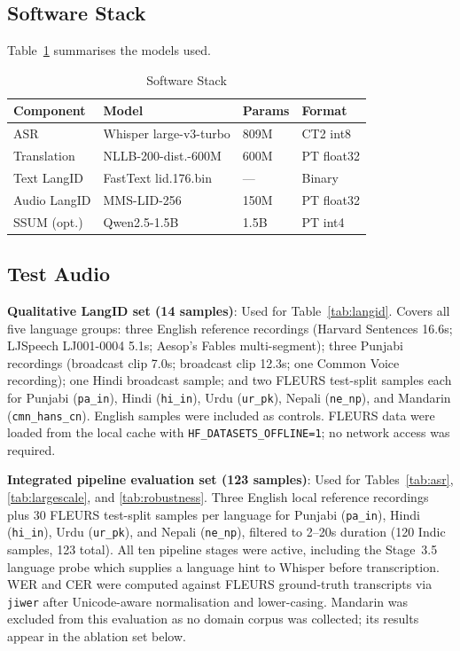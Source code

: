 \documentclass[conference]{IEEEtran}
\begin{document}
\subsection{Software Stack}

Table~\ref{tab:software} summarises the models used.

\begin{table}[htbp]
\caption{Software Stack}
\label{tab:software}
\begin{center}
\begin{tabular}{llll}
\toprule
\textbf{Component} & \textbf{Model} & \textbf{Params} & \textbf{Format} \\
\midrule
ASR & Whisper large-v3-turbo & 809M & CT2 int8 \\
Translation & NLLB-200-dist.-600M & 600M & PT float32 \\
Text LangID & FastText lid.176.bin & --- & Binary \\
Audio LangID & MMS-LID-256 & 150M & PT float32 \\
SSUM (opt.) & Qwen2.5-1.5B & 1.5B & PT int4 \\
\bottomrule
\end{tabular}
\end{center}
\end{table}

\subsection{Test Audio}

\textbf{Qualitative LangID set (14 samples)}: Used for Table~\ref{tab:langid}. Covers all five language groups: three English reference recordings (Harvard Sentences 16.6s; LJSpeech LJ001-0004 5.1s; Aesop's Fables multi-segment); three Punjabi recordings (broadcast clip 7.0s; broadcast clip 12.3s; one Common Voice recording); one Hindi broadcast sample; and two FLEURS test-split samples each for Punjabi (\texttt{pa\_in}), Hindi (\texttt{hi\_in}), Urdu (\texttt{ur\_pk}), Nepali (\texttt{ne\_np}), and Mandarin (\texttt{cmn\_hans\_cn}). English samples were included as controls. FLEURS data were loaded from the local cache with \texttt{HF\_DATASETS\_OFFLINE=1}; no network access was required.

\textbf{Integrated pipeline evaluation set (123 samples)}: Used for Tables~\ref{tab:asr}, \ref{tab:largescale}, and \ref{tab:robustness}. Three English local reference recordings plus 30 FLEURS test-split samples per language for Punjabi (\texttt{pa\_in}), Hindi (\texttt{hi\_in}), Urdu (\texttt{ur\_pk}), and Nepali (\texttt{ne\_np}), filtered to 2--20s duration (120 Indic samples, 123 total). All ten pipeline stages were active, including the Stage~3.5 language probe which supplies a language hint to Whisper before transcription. WER and CER were computed against FLEURS ground-truth transcripts via \texttt{jiwer} after Unicode-aware normalisation and lower-casing. Mandarin was excluded from this evaluation as no domain corpus was collected; its results appear in the ablation set below.
\end{document}
